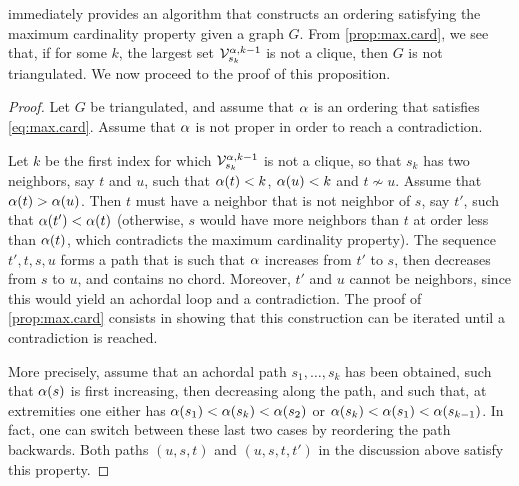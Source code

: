   immediately provides an algorithm that
constructs an ordering satisfying the maximum cardinality
property given a graph $G$. From  \cref{prop:max.card}, we see that, if for
some $k$, the largest set ${\mathcal V}^{\alpha,k-1}_{s_k}$ is not a clique, then $G$ is
not triangulated. We now proceed to the proof of this proposition.
\begin{proof}
Let $G$ be triangulated, and assume that $\alpha$ is an ordering that
satisfies \cref{eq:max.card}. Assume that $\alpha$ is not proper in
order to reach a contradiction. 

Let $k$ be the first index for which
${\mathcal V}^{\alpha,k-1}_{s_k}$ is not a clique, so that $s_k$ has two
neighbors, say $t$ and $u$, such that $\alpha(t)< k$, $\alpha(u) < k$ and $
t\not\sim u$. Assume that $\alpha(t) > \alpha(u)$. Then $t$ must have a
neighbor that is not neighbor of $s$, say $t'$, such that $\alpha(t') <
\alpha(t)$ (otherwise, $s$ would have more neighbors than $t$ at order
less than $\alpha(t)$, which contradicts the maximum cardinality property). The sequence $t', t, s, u$ forms a path that is
such that $\alpha$ increases from $t'$ to $s$, then decreases from $s$ to
$u$, and contains no chord. Moreover, $t'$ and $u$ cannot be neighbors,
since this would yield an achordal loop and a  contradiction. The proof of 
\cref{prop:max.card} consists in showing that this construction can be
iterated until a contradiction is reached.

More precisely, assume that an achordal path $s_1, \ldots, s_k$ has been obtained, such that
$\alpha(s)$ is first increasing, then decreasing along the path, and such
that, at extremities one either has $\alpha(s_1) < \alpha(s_k) <
\alpha(s_2)$ or $\alpha(s_k) <\alpha(s_1) < \alpha(s_{k-1})$. In fact, one can
switch between these last two cases by
reordering the path backwards. Both paths $(u,s,t)$ and $(u,s, t, t')$
in the discussion above satisfy this property.


\end{proof}
